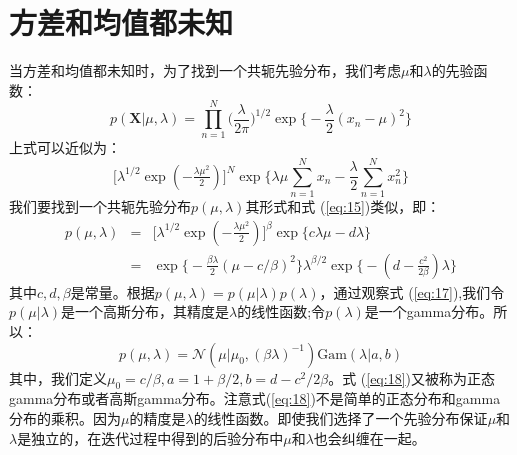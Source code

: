 \documentclass[10pt,a4paper,UTF8]{article}
\begin{document}
\section{方差和均值都未知}
\label{sec:orge2a9a4b}


当方差和均值都未知时，为了找到一个共轭先验分布，我们考虑\(\mu\)和\(\lambda\)的先验函数：
\begin{equation}
\label{eq:14}
p(\mathbf{X} | \mu,\lambda) = \prod_{n=1}^{N} \bigg(\frac{\lambda}{2\pi} \bigg)^{1/2}\exp \bigg\{ -\frac{\lambda}{2}(x_{n}-\mu)^{2}\bigg\}
\end{equation}
上式可以近似为：
\begin{equation}
\label{eq:15}
\bigg[ \lambda^{1/2}\exp(-\tfrac{\lambda\mu^{2}}{2}) \bigg]^{N}\exp\bigg\{\lambda\mu\sum_{n=1}^{N}x_{n} - \frac{\lambda}{2}\sum_{n=1}^{N}x_{n}^{2}\bigg\}
\end{equation}
我们要找到一个共轭先验分布\(p(\mu,\lambda)\)其形式和式 (\ref{eq:15})类似，即：
\begin{eqnarray}
\label{eq:17}
p(\mu,\lambda)&=& \bigg[ \lambda^{1/2}\exp(-\tfrac{\lambda\mu^{2}}{2}) \bigg]^{\beta} \exp\{c\lambda\mu - d\lambda\} \\
&=&\exp\bigg\{ -\frac{\beta\lambda}{2}(\mu - c/\beta)^{2} \bigg\}\lambda^{\beta/2}\exp\bigg\{ - (d - \frac{c^{2}}{2\beta})\lambda \bigg\}
\end{eqnarray}
其中\(c,d,\beta\)是常量。根据\(p(\mu,\lambda) = p(\mu|\lambda)p(\lambda)\)，通过观察式 (\ref{eq:17}),我们令\(p(\mu|\lambda)\)是一个高斯分布，其精度是\(\lambda\)的线性函数;令\(p(\lambda)\)是一个gamma分布。所以：
\begin{equation}
\label{eq:18}
p(\mu,\lambda) = \mathcal{N}(\mu| \mu_{0},(\beta\lambda)^{-1}) \mathrm{Gam}(\lambda|a,b)
\end{equation}
其中，我们定义\(\mu_{0} = c/\beta, a = 1+ \beta/2, b= d-c^{2}/2\beta\)。式 (\ref{eq:18})又被称为正态gamma分布或者高斯gamma分布。注意式(\ref{eq:18})不是简单的正态分布和gamma分布的乘积。因为\(\mu\)的精度是\(\lambda\)的线性函数。即使我们选择了一个先验分布保证\(\mu\)和\(\lambda\)是独立的，在迭代过程中得到的后验分布中\(\mu\)和\(\lambda\)也会纠缠在一起。
\end{document}
